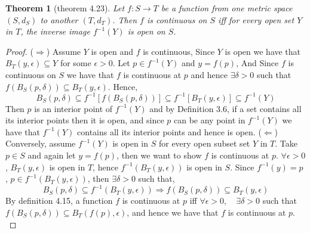 \documentclass[aps,pra,notitlepage,amsmath,amssymb,letterpaper,12pt]{revtex4-1}
\newtheorem{theorem}{Theorem}
\begin{document}
\begin{theorem}[theorem 4.23]
Let $f:S \to T$  be a function from one metric space $(S,d_{S})$ to another $(T,d_{T})$. Then $f$ is continuous on $S$ iff for every open set $Y$ in $T$, the inverse image $f^{-1}(Y)$ is open on $S$.
\end{theorem}
\begin{proof}
($\Longrightarrow$) Assume $Y$ is open and $f$ is continuous, Since $Y$ is open we have that $B_{T}(y,\epsilon) \subseteq Y$ for some $\epsilon > 0$. Let $p \in f^{-1}(Y)$ and $y=f(p)$, And Since $f$ is continuous on $S$ we have that $f$ is continuous at $p$ and hence $\exists \delta > 0$ such that  $f(B_{S}(p,\delta)) \subseteq B_{T}(y,\epsilon)$. Hence,
\[B_{S}(p,\delta) \subseteq f^{-1}[f(B_{S}(p,\delta))] \subseteq f^{-1}[B_{T}(y,\epsilon)] \subseteq f^{-1}(Y)\]
Then $p$ is an interior point of $f^{-1}(Y)$ and by Definition 3.6, if a set contains all its interior points then it is open, and since $p$ can be any point in $f^{-1}(Y)$ we have that $f^{-1}(Y)$ contains all its interior points and hence is open.
\newline{}
($\Longleftarrow$) Conversely, assume $f^{-1}(Y)$ is open in $S$ for every open subset set $Y$ in $T$. Take $p \in S$ and again let $y=f(p)$, then we want to show $f$ is continuous at $p$. $\forall \epsilon > 0$, $B_{T}(y,\epsilon)$ is open in $T$, hence $f^{-1}(B_{T}(y,\epsilon))$ is open in $S$. Since $f^{-1}(y) = p$ ,  $p \in f^{-1}(B_{T}(y,\epsilon))$, then $\exists \delta > 0$ such that,
\[B_{S}(p,\delta) \subseteq f^{-1}(B_{T}(y,\epsilon)) \Rightarrow f(B_{S}(p,\delta)) \subseteq B_{T}(y,\epsilon)\]
By definition 4.15, a function $f$ is continuous at $p$ iff $\forall \epsilon > 0, \quad \exists \delta > 0$ such that $ f(B_{S}(p,\delta)) \subseteq B_{T}(f(p),\epsilon)$, and hence we have that $f$ is continuous at $p$.
$$ $$
\end{proof}
\end{document}
